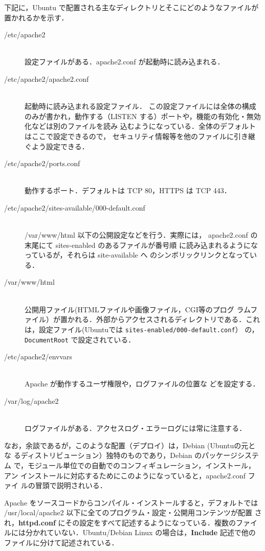 下記に，Ubuntu で配置される主なディレクトリとそこにどのようなファイルが置かれるかを示す．

\begin{description}
 \item[/etc/apache2] \ \\
            設定ファイルがある．apache2.conf が起動時に読み込まれる．
 \item[/etc/apache2/apache2.conf] \ \\ 起動時に読み込まれる設定ファイル．
	    この設定ファイルには全体の構成のみが書かれ，動作する（LISTEN
            する）ポートや，機能の有効化・無効化などは別のファイルを読み
            込むようになっている．全体のデフォルトはここで設定できるので，
	    セキュリティ情報等を他のファイルに引き継ぐよう設定できる．
 \item[/etc/apache2/ports.conf]  \ \\ 動作するポート．デフォルトは TCP
	    80，HTTPS は TCP 443．
 \item[/etc/apache2/sites-available/000-default.conf] \ \\
	    /var/www/html 以下の公開設定などを行う．実際には，
	    apache2.conf の末尾にて sites-enabled のあるファイルが番号順
	    に読み込まれるようになっているが，それらは site-available へ
	    のシンボリックリンクとなっている．
 \item[/var/www/html] \ \\
            公開用ファイル(HTMLファイルや画像ファイル，CGI等のプログ
	    ラムファイル）が置かれる．外部からアクセスされるディレクトリである．これは，設定ファイル(Ubuntuでは \texttt{sites-enabled/000-default.conf}） の，\texttt{DocumentRoot} で設定されている．
 \item[/etc/apache2/envvars] \ \\ Apache が動作するユーザ権限や，ログファイルの位置な
	    どを設定する．
 \item[/var/log/apache2] \ \\
            ログファイルがある．アクセスログ・エラーログには常に注意する．
\end{description}

なお，余談であるが，このような配置（デプロイ）は，Debian (Ubuntuの元とな
るディストリビューション）独特のものであり，Debian のパッケージシステム
で，モジュール単位での自動でのコンフィギュレーション，インストール，アン
インストールに対応するためにこのようになっていると，apache2.conf ファイ
ルの冒頭で説明されいる．

Apache をソースコードからコンパイル・インストールすると，デフォルトでは
/usr/local/apache2 以下に全てのプログラム・設定・公開用コンテンツが配置
され，\textbf{httpd.conf} にその設定をすべて記述するようになっている．複数のファイルには分かれていない．Ubuntu/Debian Linux の場合は，\textbf{Include} 記述で他のファイルに分けて記述されている．


